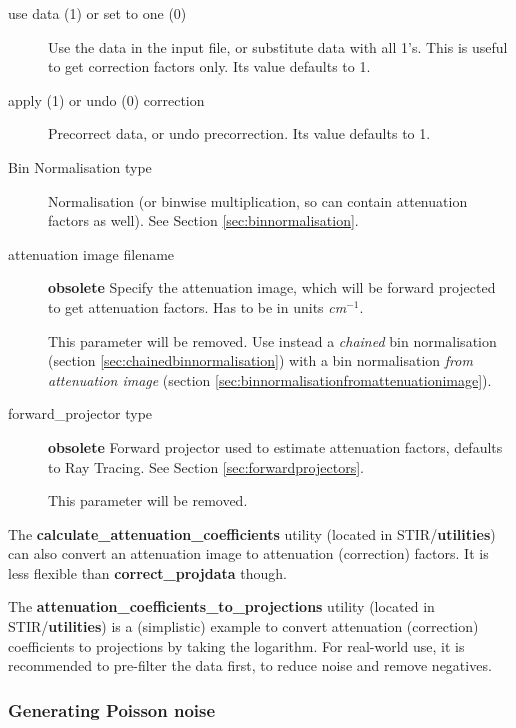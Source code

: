 \documentclass{article}
\begin{document}
\begin{description}

\item[use data (1) or set to one (0)]
Use the data in the input file, or substitute data with all 1's. 
This is useful to get correction factors only. Its value defaults 
to 1.

\item[apply (1) or undo (0) correction]
Precorrect data, or undo precorrection. Its value defaults to 
1.

\item[Bin Normalisation type]
Normalisation (or binwise multiplication, so can contain attenuation 
factors as well). See Section \ref{sec:binnormalisation}.


\item[attenuation image filename] \textbf{obsolete}
Specify the attenuation image, which will be forward projected 
to get attenuation factors. Has to be in units \textit{cm}$^{\mathit{-1}}$.


This parameter will be removed. Use instead a \textit{chained} 
bin normalisation (section \ref{sec:chainedbinnormalisation}) 
with a bin normalisation 
\textit{from attenuation image} (section \ref{sec:binnormalisationfromattenuationimage}).


\item[forward\_projector type] \textbf{obsolete}
Forward projector used to estimate attenuation factors, defaults 
to Ray Tracing. See Section \ref{sec:forwardprojectors}.

This parameter will be removed.
\end{description}

The \textbf{calculate\_attenuation\_coefficients} utility (located in STIR/\textbf{utilities})
can also convert an attenuation image to attenuation (correction) factors. It is less
flexible than \textbf{correct\_projdata} though.

The \textbf{attenuation\_coefficients\_to\_projections} utility 
(located in STIR/\textbf{utilities}) is a (simplistic) example to convert
attenuation (correction) coefficients to projections by taking the logarithm.
For real-world use, it is recommended to pre-filter the data first, to reduce noise
and remove negatives.


\subsubsection{
Generating Poisson noise}
\end{document}
